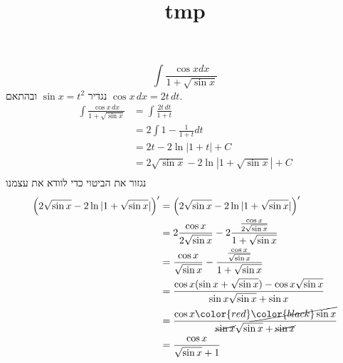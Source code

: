 
\title{tmp}
\usepackage{cancel}



\[
	\int \frac{\cos x dx}{1 + \sqrt{\sin x}}
\]
נגדיר $\sin x = t^2$ ובהתאם $\cos x \, dx = 2t \, dt$.
\begin{align*}
	\int \frac{\cos x \, dx}{1 + \sqrt{\sin x}}
	& = \int \frac{2t \, dt}{1 + t} \\
	& = 2 \int 1 - \frac{1}{1 + t} dt \\
	& = 2t - 2\ln|1 + t| + C \\
	& = 2\sqrt{\sin x} - 2\ln|1 + \sqrt{\sin x}| + C \\
\end{align*}
נגזור את הביטוי כדי לוודא את עצמנו
\begin{align*}
	\left( 2\sqrt{\sin x} - 2\ln|1 + \sqrt{\sin x}| \right)'
	& = \left( 2\sqrt{\sin x} - 2\ln|1 + \sqrt{\sin x}| \right)' \\
	& = 2 \frac{\cos x}{2 \sqrt{\sin x}} - 2 \frac{\frac{\cos x}{2 \sqrt{\sin x}}}{1 + \sqrt{\sin x}} \\
	& = \frac{\cos x}{\sqrt{\sin x}} - \frac{\frac{\cos x}{\sqrt{\sin x}}}{1 + \sqrt{\sin x}} \\
	& = \frac{\cos x (\sin x + \sqrt{\sin x})- \cos x \sqrt{\sin x}}{\sin x \sqrt{\sin x} + \sin x} \\
	& = \frac{\cos x \color{red}\cancel{\color{black}\sin x}}{\cancel{\sin x} \sqrt{\sin x} + \cancel{\sin x}} \\
	& = \frac{\cos x}{\sqrt{\sin x} + 1} \\
\end{align*}



